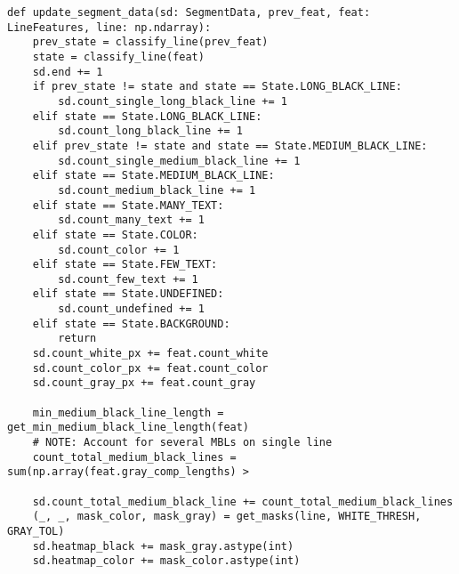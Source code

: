 \begin{lstlisting}[caption={Функция обновления информации о сегменте}, label={lst:usd}]
def update_segment_data(sd: SegmentData, prev_feat, feat: LineFeatures, line: np.ndarray):
    prev_state = classify_line(prev_feat)
    state = classify_line(feat)
    sd.end += 1
    if prev_state != state and state == State.LONG_BLACK_LINE:
        sd.count_single_long_black_line += 1
    elif state == State.LONG_BLACK_LINE:
        sd.count_long_black_line += 1
    elif prev_state != state and state == State.MEDIUM_BLACK_LINE:
        sd.count_single_medium_black_line += 1
    elif state == State.MEDIUM_BLACK_LINE:
        sd.count_medium_black_line += 1
    elif state == State.MANY_TEXT:
        sd.count_many_text += 1
    elif state == State.COLOR:
        sd.count_color += 1
    elif state == State.FEW_TEXT:
        sd.count_few_text += 1
    elif state == State.UNDEFINED:
        sd.count_undefined += 1
    elif state == State.BACKGROUND:
        return
    sd.count_white_px += feat.count_white
    sd.count_color_px += feat.count_color
    sd.count_gray_px += feat.count_gray

    min_medium_black_line_length = get_min_medium_black_line_length(feat)
    # NOTE: Account for several MBLs on single line
    count_total_medium_black_lines = sum(np.array(feat.gray_comp_lengths) >

    sd.count_total_medium_black_line += count_total_medium_black_lines
    (_, _, mask_color, mask_gray) = get_masks(line, WHITE_THRESH, GRAY_TOL)
    sd.heatmap_black += mask_gray.astype(int)
    sd.heatmap_color += mask_color.astype(int)
\end{lstlisting}

